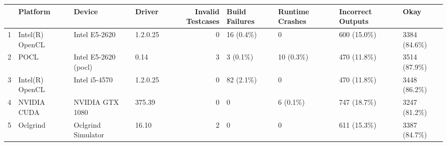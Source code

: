 \begin{tabular}{llllrllll}
\toprule
{} &         Platform &                Device &    Driver &  Invalid Testcases & Build Failures & Runtime Crashes & Incorrect Outputs &          Okay \\
\midrule
1 &  Intel(R) OpenCL &         Intel E5-2620 &  1.2.0.25 &                  0 &      16 (0.4\%) &               0 &       600 (15.0\%) &  3384 (84.6\%) \\
2 &             POCL &  Intel E5-2620 (pocl) &      0.14 &                  3 &       3 (0.1\%) &       10 (0.3\%) &       470 (11.8\%) &  3514 (87.9\%) \\
3 &  Intel(R) OpenCL &         Intel i5-4570 &  1.2.0.25 &                  0 &      82 (2.1\%) &               0 &       470 (11.8\%) &  3448 (86.2\%) \\
4 &      NVIDIA CUDA &       NVIDIA GTX 1080 &    375.39 &                  0 &              0 &        6 (0.1\%) &       747 (18.7\%) &  3247 (81.2\%) \\
5 &         Oclgrind &    Oclgrind Simulator &     16.10 &                  2 &              0 &               0 &       611 (15.3\%) &  3387 (84.7\%) \\
\bottomrule
\end{tabular}

